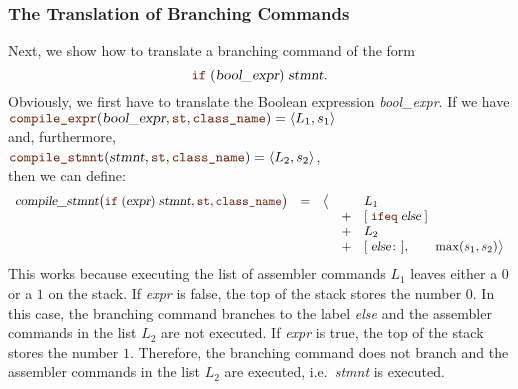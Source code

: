 \subsubsection{The Translation of Branching Commands}
Next, we show how to translate a branching command of the form
\[ \mytt{if}\; (\textsl{bool\_expr})\; \textsl{stmnt}. \]
Obviously, we first have to translate the Boolean expression \textsl{bool\_expr}.
If we have
\\[0.2cm]
\hspace*{1.3cm}
$\mytt{compile\_expr}(\textsl{bool\_expr}, \mytt{st}, \mytt{class\_name}) = \pair(L_1, s_1)$
\\[0.2cm]
and, furthermore, 
\\[0.2cm]
\hspace*{1.3cm}
$\mytt{compile\_stmnt}(\textsl{stmnt}, \mytt{st}, \mytt{class\_name}) = \pair(L_2, s_2)$,
\\[0.2cm]
then we can define:
\[
   \begin{array}[t]{lcccl}
   \textsl{compile\_stmnt}\bigl(\mytt{if}\; (\textsl{expr})\;\textsl{stmnt}, \mytt{st}, \mytt{class\_name}\bigr) & = & \bigl\langle & & L_1  \\
   &&& + & [\;\mytt{ifeq}\;\textsl{else}\;] \\
   &&& + & L_2 \\
   &&& + & [\;\textsl{else}\mytt{:}\;], \qquad \max(s_1, s_2) \bigr\rangle        
\end{array}
\]
This works because executing the list of assembler commands $L_1$ leaves either a $0$ or a $1$ on the stack.
If \textsl{expr} is false, the top of the stack stores the number $0$.  In this case, the branching command
 branches to the label \textsl{else} and the assembler commands in the list $L_2$ are not
executed.  If \textsl{expr} is true, the top of the stack stores the number $1$.  Therefore, the branching
command  does not branch and the assembler commands in the list $L_2$ are executed,
i.e.~\textsl{stmnt} is executed.

